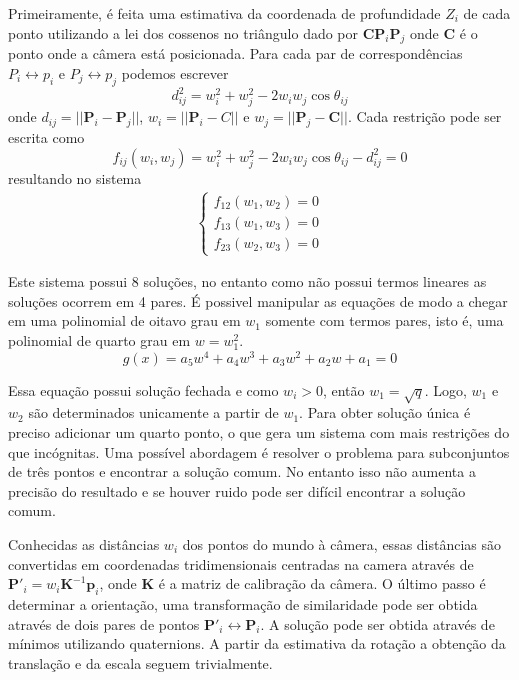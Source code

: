 Primeiramente, é feita uma estimativa da coordenada de profundidade $Z_i$ de cada ponto utilizando a lei dos cossenos no triângulo dado por $\bm{C} \bm{P}_i \bm{P}_j$ onde $\bm{C}$ é o ponto onde a câmera está posicionada. Para cada par de correspondências $P_i \leftrightarrow p_i$ e $P_j \leftrightarrow p_j$ podemos escrever \cite{quan1999linear} 
\begin{equation}
d_{ij}^2 = w_i^2 + w_j^2 -2 w_i w_j \cos \theta_{ij}
\end{equation}
onde $d_{ij} = ||\bm{P}_i - \bm{P}_j||$, $w_i = ||\bm{P}_i - C||$ e $w_j = ||\bm{P}_j - \bm{C}||$. Cada restrição pode ser escrita como 
\begin{equation}
f_{ij}(w_i, w_j) = w_i^2 + w_j^2 - 2w_i w_j \cos \theta_{ij} - d_{ij}^2 = 0
\end{equation}
resultando no sistema
\begin{align*}
\begin{cases}
f_{12}(w_1, w_2) = 0 \\ 
f_{13}(w_1, w_3) = 0 \\ 
f_{23}(w_2, w_3) = 0
\end{cases}
\end{align*}

Este sistema possui 8 soluções, no entanto como não possui termos lineares as soluções ocorrem em 4 pares. É possivel manipular as equações de modo a chegar em uma polinomial de oitavo grau em $w_1$ somente com termos pares, isto é, uma polinomial de quarto grau em $w = w_1^2$.
\begin{equation}
g(x) = a_5 w^4 + a_4 w^3 + a_3 w^2 + a_2 w + a_1 = 0
\end{equation}

Essa equação possui solução fechada e como $w_i > 0$, então $w_1 = \sqrt{q}$. Logo, $w_1$ e $w_2$ são determinados unicamente a partir de $w_1$. Para obter solução única é preciso adicionar um quarto ponto, o que gera um sistema com mais restrições do que incógnitas. Uma possível abordagem é resolver o problema para subconjuntos de três pontos e encontrar a solução comum. No entanto isso não aumenta a precisão do resultado e se houver ruido pode ser difícil encontrar a solução comum. 

Conhecidas as distâncias $w_i$ dos pontos do mundo à câmera, essas distâncias são convertidas em coordenadas tridimensionais centradas na camera através de $\bm{P'}_i = w_i \bm{K}^{-1} \bm{p}_i$, onde $\bm{K}$ é a matriz de calibração da câmera. O último passo é determinar a orientação, uma transformação de similaridade pode ser obtida através de dois pares de pontos $\bm{P'}_i \leftrightarrow \bm{P}_i$. A solução pode ser obtida através de mínimos utilizando quaternions. A partir da estimativa da rotação a obtenção da translação e da escala seguem trivialmente. 

